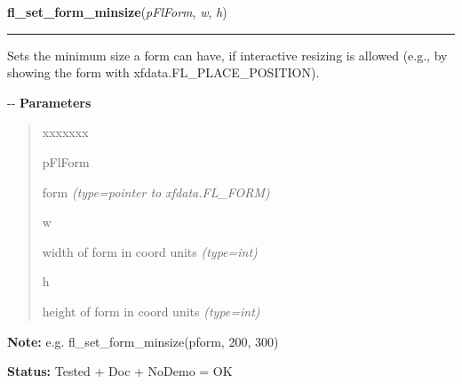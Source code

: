 \hspace{.8\funcindent}\begin{boxedminipage}{\funcwidth}

    \raggedright \textbf{fl\_set\_form\_minsize}(\textit{pFlForm}, \textit{w}, \textit{h})

    \vspace{-1.5ex}

    \rule{\textwidth}{0.5\fboxrule}
\setlength{\parskip}{2ex}

Sets the minimum size a form can have, if interactive resizing is
allowed (e.g., by showing the form with xfdata.FL\_PLACE\_POSITION).

-{}-
\setlength{\parskip}{1ex}
      \textbf{Parameters}
      \vspace{-1ex}

      \begin{quote}
        \begin{Ventry}{xxxxxxx}

          \item[pFlForm]


form
            {\it (type=pointer to xfdata.FL\_FORM)}

          \item[w]


width of form in coord units
            {\it (type=int)}

          \item[h]


height of form in coord units
            {\it (type=int)}

        \end{Ventry}

      \end{quote}

\textbf{Note:} 
e.g. fl\_set\_form\_minsize(pform, 200, 300)


\textbf{Status:} 
Tested + Doc + NoDemo = OK


    \end{boxedminipage}

    \label{xformslib:flbasic:fl_set_form_maxsize}

    \vspace{0.5ex}

